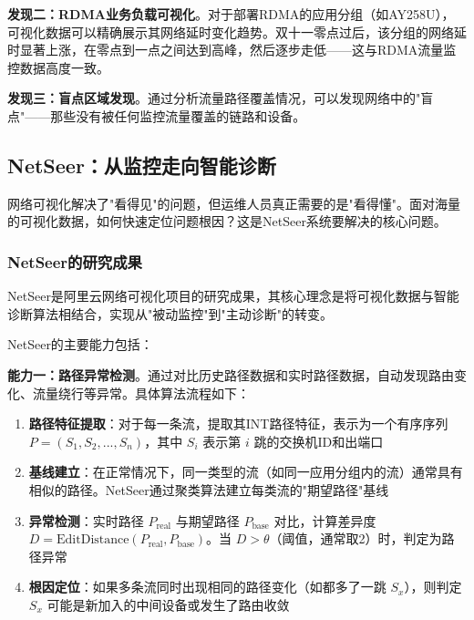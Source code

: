 \textbf{发现二：RDMA业务负载可视化}。对于部署RDMA的应用分组（如AY258U），可视化数据可以精确展示其网络延时变化趋势。双十一零点过后，该分组的网络延时显著上涨，在零点到一点之间达到高峰，然后逐步走低——这与RDMA流量监控数据高度一致。

\textbf{发现三：盲点区域发现}。通过分析流量路径覆盖情况，可以发现网络中的"盲点"——那些没有被任何监控流量覆盖的链路和设备。

\subsection{NetSeer：从监控走向智能诊断}

网络可视化解决了"看得见"的问题，但运维人员真正需要的是"看得懂"。面对海量的可视化数据，如何快速定位问题根因？这是NetSeer系统要解决的核心问题。

\subsubsection{NetSeer的研究成果}

NetSeer是阿里云网络可视化项目的研究成果，其核心理念是将可视化数据与智能诊断算法相结合，实现从"被动监控"到"主动诊断"的转变。

NetSeer的主要能力包括：

\textbf{能力一：路径异常检测}。通过对比历史路径数据和实时路径数据，自动发现路由变化、流量绕行等异常。具体算法流程如下：
\begin{enumerate}
    \item \textbf{路径特征提取}：对于每一条流，提取其INT路径特征，表示为一个有序序列 $P = (S_1, S_2, ..., S_n)$，其中 $S_i$ 表示第 $i$ 跳的交换机ID和出端口
    \item \textbf{基线建立}：在正常情况下，同一类型的流（如同一应用分组内的流）通常具有相似的路径。NetSeer通过聚类算法建立每类流的"期望路径"基线
    \item \textbf{异常检测}：实时路径 $P_{\text{real}}$ 与期望路径 $P_{\text{base}}$ 对比，计算差异度 $D = \text{EditDistance}(P_{\text{real}}, P_{\text{base}})$。当 $D > \theta$（阈值，通常取2）时，判定为路径异常
    \item \textbf{根因定位}：如果多条流同时出现相同的路径变化（如都多了一跳 $S_x$），则判定 $S_x$ 可能是新加入的中间设备或发生了路由收敛
\end{enumerate}

